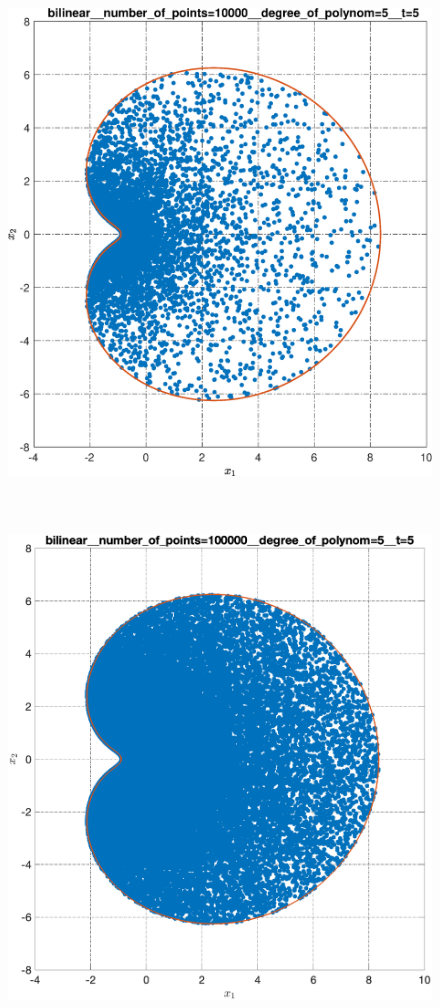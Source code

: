 \documentclass[../main.tex]{subfiles}
\begin{document}
\begin{figure}[ht!]
\begin{minipage}[b]{.3\linewidth}
  		\includegraphics[width=\linewidth]{images/bilinear__number_of_points=10000__degree_of_polynom=5__t=5.eps}
  	\end{minipage} 
  	\hfill
  	\begin{minipage}[b]{.3\linewidth} 
  		\small
  		\centering 
  		\includegraphics[width=\linewidth]{images/bilinear__number_of_points=100000__degree_of_polynom=5__t=5.eps}

\end{minipage}
\end{figure}
\end{document}
